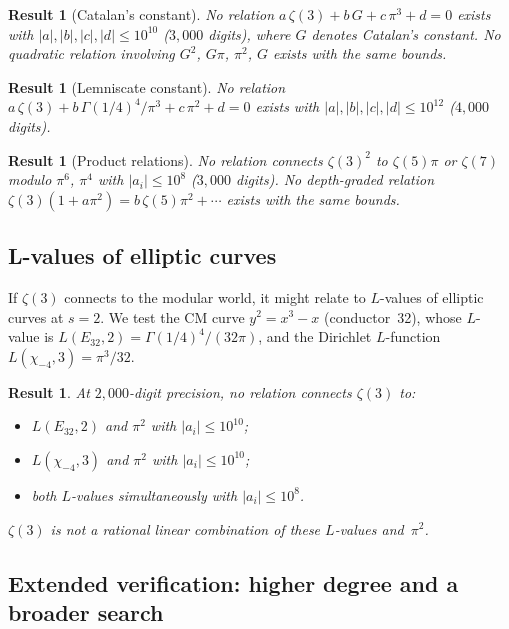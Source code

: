 \documentclass[12pt]{article}
\newtheorem{result}[theorem]{Result}
\theoremstyle{definition}
\theoremstyle{remark}
\begin{document}
\begin{result}[Catalan's constant]\label{res:catalan}
No relation $a\,\zeta(3)+b\,G+c\,\pi^3+d=0$ exists with
$|a|,|b|,|c|,|d|\le 10^{10}$ ($3{,}000$ digits), where $G$ denotes
Catalan's constant.  No quadratic relation involving $G^2$, $G\pi$,
$\pi^2$, $G$ exists with the same bounds.
\end{result}

\begin{result}[Lemniscate constant]\label{res:lemniscate}
No relation $a\,\zeta(3)+b\,\Gamma(1/4)^4/\pi^3+c\,\pi^2+d=0$ exists
with $|a|,|b|,|c|,|d|\le 10^{12}$ ($4{,}000$ digits).
\end{result}

\begin{result}[Product relations]\label{res:products}
No relation connects $\zeta(3)^2$ to $\zeta(5)\pi$ or $\zeta(7)$
modulo $\pi^6$, $\pi^4$ with $|a_i|\le 10^8$ ($3{,}000$ digits).
No depth-graded relation
$\zeta(3)(1+a\pi^2)=b\,\zeta(5)\pi^2+\cdots$ exists with the same
bounds.
\end{result}


\subsection{L-values of elliptic curves}\label{sec:lvalues}

If $\zeta(3)$ connects to the modular world, it might relate to
$L$-values of elliptic curves at $s=2$.  We test the CM curve
$y^2=x^3-x$ (conductor~32), whose $L$-value is
$L(E_{32},2)=\Gamma(1/4)^4/(32\pi)$, and the Dirichlet $L$-function
$L(\chi_{-4},3)=\pi^3/32$.

\begin{result}\label{res:lvalues}
At $2{,}000$-digit precision, no relation connects $\zeta(3)$ to:
\begin{itemize}
  \item $L(E_{32},2)$ and $\pi^2$ with $|a_i|\le 10^{10}$;
  \item $L(\chi_{-4},3)$ and $\pi^2$ with $|a_i|\le 10^{10}$;
  \item both $L$-values simultaneously with $|a_i|\le 10^8$.
\end{itemize}
$\zeta(3)$ is not a rational linear combination of these $L$-values
and~$\pi^2$.
\end{result}

\subsection{Extended verification: higher degree and a broader
search}\label{sec:extended}
\end{document}
